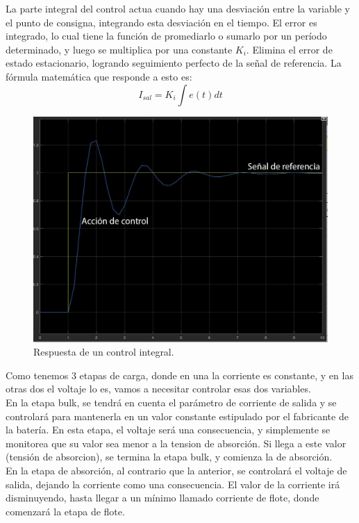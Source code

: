 La parte integral del control actua cuando hay una desviación entre la variable y el punto de consigna, integrando esta desviación en el tiempo. El error es integrado, lo cual tiene la función de promediarlo o sumarlo por un período determinado, y luego se multiplica por una constante $K_{i}$. Elimina el error de estado estacionario, logrando seguimiento perfecto de la señal de referencia. La fórmula matemática que responde a esto es:\\

\begin{equation}
    I_{sal} = K_{i} \int e(t) dt
\end{equation}


\begin{figure}[H]
    \centering
    \includegraphics[width=0.7\linewidth]{MPPT/Imagen 15-10-23 a las 14.53.JPG}
    \caption{Respuesta de un control integral.}
    \label{fig:integral}
\end{figure}

Como tenemos 3 etapas de carga, donde en una la corriente es constante, y en las otras dos el voltaje lo es, vamos a necesitar controlar esas dos variables.\\

En la etapa bulk, se tendrá en cuenta el parámetro de corriente de salida y se controlará para mantenerla en un valor constante estipulado por el fabricante de la batería. En esta etapa, el voltaje será una consecuencia, y simplemente se monitorea que su valor sea menor a la tension de absorción. Si llega a este valor (tensión de absorcion), se termina la etapa bulk, y comienza la de absorción.\\

En la etapa de absorción, al contrario que la anterior, se controlará el voltaje de salida, dejando la corriente como una consecuencia. El valor de la corriente irá disminuyendo, hasta llegar a un mínimo llamado corriente de flote, donde comenzará la etapa de flote.\\

